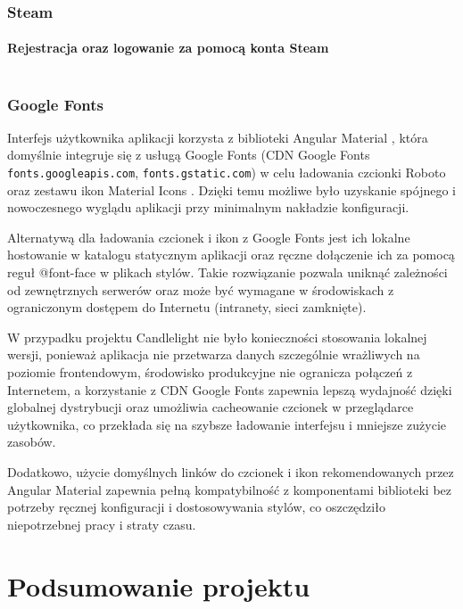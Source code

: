 \documentclass[a4paper,twoside,12pt]{book}
\begin{document}
\subsection{Steam}
\subsubsection{Rejestracja oraz logowanie za pomocą konta Steam}
\begin{lstlisting}

\end{lstlisting}

\subsection{Google Fonts}

Interfejs użytkownika aplikacji korzysta z biblioteki Angular Material \cite{angularmaterial2025}, która domyślnie integruje się z usługą Google Fonts (CDN Google Fonts \nolinkurl{fonts.googleapis.com}, \nolinkurl{fonts.gstatic.com})  w celu ładowania czcionki Roboto \cite{roboto2025} oraz zestawu ikon Material Icons \cite{materialicons2025}. Dzięki temu możliwe było uzyskanie spójnego i nowoczesnego wyglądu aplikacji przy minimalnym nakładzie konfiguracji.

Alternatywą dla ładowania czcionek i ikon z Google Fonts jest ich lokalne hostowanie w katalogu statycznym aplikacji oraz ręczne dołączenie ich za pomocą reguł @font-face w plikach stylów. Takie rozwiązanie pozwala uniknąć zależności od zewnętrznych serwerów oraz może być wymagane w środowiskach z ograniczonym dostępem do Internetu (intranety, sieci zamknięte).

W przypadku projektu Candlelight nie było konieczności stosowania lokalnej wersji, ponieważ aplikacja nie przetwarza danych szczególnie wrażliwych na poziomie frontendowym, środowisko produkcyjne nie ogranicza połączeń z Internetem, a korzystanie z CDN Google Fonts zapewnia lepszą wydajność dzięki globalnej dystrybucji oraz umożliwia cacheowanie czcionek w przeglądarce użytkownika, co przekłada się na szybsze ładowanie interfejsu i mniejsze zużycie zasobów.

Dodatkowo, użycie domyślnych linków do czcionek i ikon rekomendowanych przez Angular Material zapewnia pełną kompatybilność z komponentami biblioteki bez potrzeby ręcznej konfiguracji i dostosowywania stylów, co oszczędziło niepotrzebnej pracy i straty czasu.

\chapter{Podsumowanie projektu}
\end{document}
